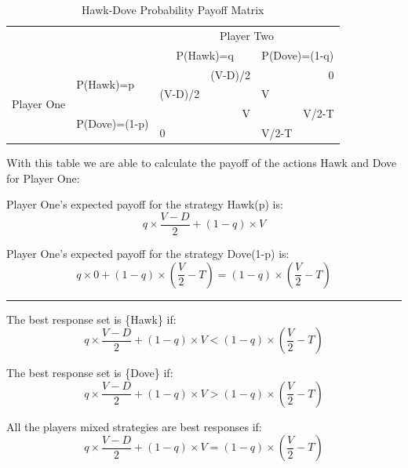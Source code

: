 \documentclass[a4paper, 11pt]{article}
\begin{document}
\begin{table}[H]
\centering
\caption{Hawk-Dove Probability Payoff Matrix}
\label{tab-HawkDoveMixedStrategy}
\begin{tabular}{cl|ll|ll|}
\multicolumn{1}{l}{}                             &                                & \multicolumn{4}{c|}{Player Two}                                             \\ \cline{3-6} 
\multicolumn{1}{l}{}                             &                                & \multicolumn{2}{c|}{P(Hawk)=q}         & \multicolumn{2}{c|}{P(Dove)=(1-q)} \\ \hline
\multicolumn{1}{c|}{\multirow{4}{*}{Player One}} & \multirow{2}{*}{P(Hawk)=p}     &         & \multicolumn{1}{r|}{(V-D)/2} &       & \multicolumn{1}{r|}{0}     \\
\multicolumn{1}{c|}{}                            &                                & (V-D)/2 &                              & V     &                            \\ \cline{2-6} 
\multicolumn{1}{c|}{}                            & \multirow{2}{*}{P(Dove)=(1-p)} &         & \multicolumn{1}{r|}{V}       &       & \multicolumn{1}{r|}{V/2-T} \\
\multicolumn{1}{c|}{}                            &                                & 0       &                              & V/2-T &                            \\ \hline
\end{tabular}
\end{table}

With this table we are able to calculate the payoff of the actions Hawk and Dove for Player One:

Player One's expected payoff for the strategy Hawk(p) is:
\[ q \times \frac{V-D}{2} + (1-q) \times V \]

Player One's expected payoff for the strategy Dove(1-p) is:
\[ q \times 0 + (1-q) \times ( \frac{V}{2} - T) = (1-q) \times ( \frac{V}{2} - T) \]

\hrule
\vspace{6pt}

The best response set is \{Hawk\} if:
\[ q \times \frac{V-D}{2} + (1-q) \times V < (1-q) \times ( \frac{V}{2} - T) \]

The best response set is \{Dove\} if:
\[ q \times \frac{V-D}{2} + (1-q) \times V > (1-q) \times ( \frac{V}{2} - T) \]

All the players mixed strategies are best responses if:
\[ q \times \frac{V-D}{2} + (1-q) \times V = (1-q) \times ( \frac{V}{2} - T) \]
\end{document}
